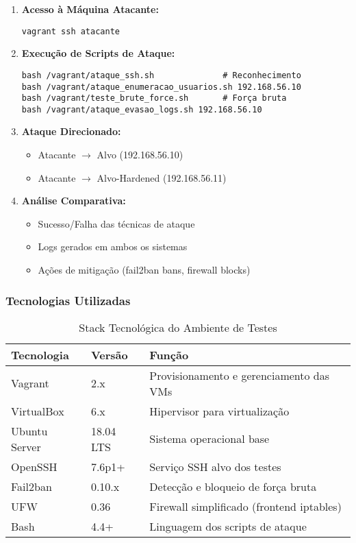 \documentclass[12pt]{article}
\begin{document}
\begin{enumerate}
    \item \textbf{Acesso à Máquina Atacante:}
        \begin{verbatim}
vagrant ssh atacante
        \end{verbatim}
    
    \item \textbf{Execução de Scripts de Ataque:}
        \begin{verbatim}
bash /vagrant/ataque_ssh.sh              # Reconhecimento
bash /vagrant/ataque_enumeracao_usuarios.sh 192.168.56.10
bash /vagrant/teste_brute_force.sh       # Força bruta
bash /vagrant/ataque_evasao_logs.sh 192.168.56.10
        \end{verbatim}
    
    \item \textbf{Ataque Direcionado:}
        \begin{itemize}
            \item Atacante $\rightarrow$ Alvo (192.168.56.10)
            \item Atacante $\rightarrow$ Alvo-Hardened (192.168.56.11)
        \end{itemize}
    
    \item \textbf{Análise Comparativa:}
        \begin{itemize}
            \item Sucesso/Falha das técnicas de ataque
            \item Logs gerados em ambos os sistemas
            \item Ações de mitigação (fail2ban bans, firewall blocks)
        \end{itemize}
\end{enumerate}

\subsubsection{Tecnologias Utilizadas}

\begin{table}[h]
\centering
\begin{tabular}{|l|l|p{6cm}|}
\hline
\textbf{Tecnologia} & \textbf{Versão} & \textbf{Função} \\ \hline
Vagrant & 2.x & Provisionamento e gerenciamento das VMs \\ \hline
VirtualBox & 6.x & Hipervisor para virtualização \\ \hline
Ubuntu Server & 18.04 LTS & Sistema operacional base \\ \hline
OpenSSH & 7.6p1+ & Serviço SSH alvo dos testes \\ \hline
Fail2ban & 0.10.x & Detecção e bloqueio de força bruta \\ \hline
UFW & 0.36 & Firewall simplificado (frontend iptables) \\ \hline
Bash & 4.4+ & Linguagem dos scripts de ataque \\ \hline
\end{tabular}
\caption{Stack Tecnológica do Ambiente de Testes}
\end{table}
\end{document}
